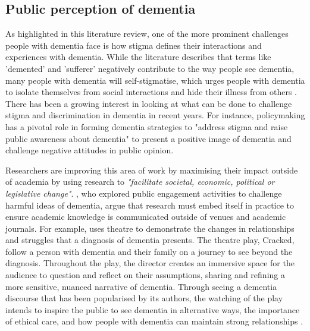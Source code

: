 \subsection{Public perception of dementia}
\label{BL:PublicPerception}
As highlighted in this literature review, one of the more prominent challenges people with dementia face is how stigma defines their interactions and experiences with dementia. While the literature describes that terms like 'demented' and 'sufferer' negatively contribute to the way people see dementia, many people with dementia will self-stigmatise, which urges people with dementia to isolate themselves from social interactions and hide their illness from others \citep{milne2010d}. There has been a growing interest in looking at what can be done to challenge stigma and discrimination in dementia in recent years. For instance, policymaking has a pivotal role in forming dementia strategies to "address stigma and raise public awareness about dementia" to present a positive image of dementia and challenge negative attitudes in public opinion. 

Researchers are improving this area of work by maximising their impact outside of academia by using research to \textit{"facilitate societal, economic, political or legislative change"}. \cite{tischler2020using}, who explored public engagement activities to challenge harmful ideas of dementia, argue that research must embed itself in practice to ensure academic knowledge is communicated outside of venues and academic journals. For example, \cite{kontos_raising_2018} uses theatre to demonstrate the changes in relationships and struggles that a diagnosis of dementia presents. The theatre play, Cracked, follow a person with dementia and their family on a journey to see beyond the diagnosis. Throughout the play, the director creates an immersive space for the audience to question and reflect on their assumptions, sharing and refining a more sensitive, nuanced narrative of dementia. Through seeing a dementia discourse that has been popularised by its authors, the watching of the play intends to inspire the public to see dementia in alternative ways, the importance of ethical care, and how people with dementia can maintain strong relationships \citep{gray2020knowledge}.

